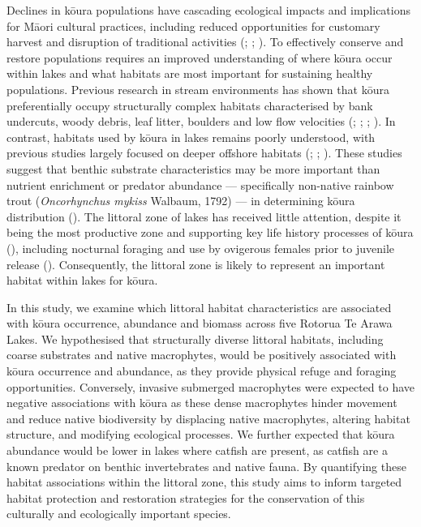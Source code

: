 \documentclass[
  letterpaper,
  DIV=11,
  numbers=noendperiod]{scrartcl}
\begin{document}
Declines in kōura populations have cascading ecological impacts and
implications for Māori cultural practices, including reduced
opportunities for customary harvest and disruption of traditional
activities (;
;
). To effectively conserve
and restore populations requires an improved understanding of where
kōura occur within lakes and what habitats are most important for
sustaining healthy populations. Previous research in stream environments
has shown that kōura preferentially occupy structurally complex habitats
characterised by bank undercuts, woody debris, leaf litter, boulders and
low flow velocities (;
;
;
). In contrast, habitats
used by kōura in lakes remains poorly understood, with previous studies
largely focused on deeper offshore habitats
(;
;
). These studies suggest
that benthic substrate characteristics may be more important than
nutrient enrichment or predator abundance --- specifically non-native
rainbow trout (\emph{Oncorhynchus mykiss} Walbaum, 1792) --- in
determining kōura distribution (). The littoral zone of lakes has received little attention,
despite it being the most productive zone and supporting key life
history processes of kōura (), including nocturnal foraging and use by ovigerous
females prior to juvenile release (). Consequently, the littoral zone is likely to represent an
important habitat within lakes for kōura.

In this study, we examine which littoral habitat characteristics are
associated with kōura occurrence, abundance and biomass across five
Rotorua Te Arawa Lakes. We hypothesised that structurally diverse
littoral habitats, including coarse substrates and native macrophytes,
would be positively associated with kōura occurrence and abundance, as
they provide physical refuge and foraging opportunities. Conversely,
invasive submerged macrophytes were expected to have negative
associations with kōura as these dense macrophytes hinder movement and
reduce native biodiversity by displacing native macrophytes, altering
habitat structure, and modifying ecological processes. We further
expected that kōura abundance would be lower in lakes where catfish are
present, as catfish are a known predator on benthic invertebrates and
native fauna. By quantifying these habitat associations within the
littoral zone, this study aims to inform targeted habitat protection and
restoration strategies for the conservation of this culturally and
ecologically important species.
\end{document}
